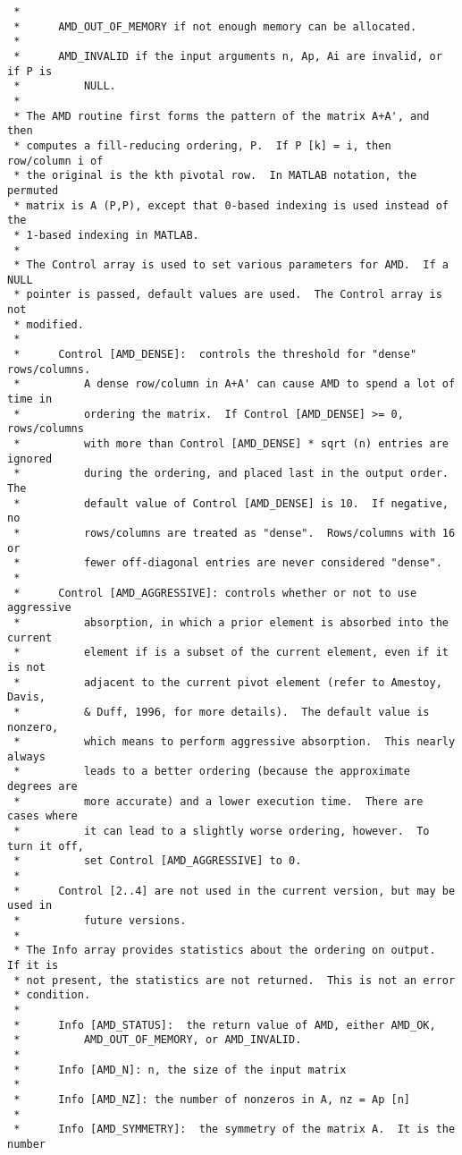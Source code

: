 \documentclass[11pt]{article}
\begin{document}
{\begin{verbatim}
 *
 *      AMD_OUT_OF_MEMORY if not enough memory can be allocated.
 *
 *      AMD_INVALID if the input arguments n, Ap, Ai are invalid, or if P is
 *          NULL.
 *
 * The AMD routine first forms the pattern of the matrix A+A', and then
 * computes a fill-reducing ordering, P.  If P [k] = i, then row/column i of
 * the original is the kth pivotal row.  In MATLAB notation, the permuted
 * matrix is A (P,P), except that 0-based indexing is used instead of the
 * 1-based indexing in MATLAB.
 *
 * The Control array is used to set various parameters for AMD.  If a NULL
 * pointer is passed, default values are used.  The Control array is not
 * modified.
 *
 *      Control [AMD_DENSE]:  controls the threshold for "dense" rows/columns.
 *          A dense row/column in A+A' can cause AMD to spend a lot of time in
 *          ordering the matrix.  If Control [AMD_DENSE] >= 0, rows/columns
 *          with more than Control [AMD_DENSE] * sqrt (n) entries are ignored
 *          during the ordering, and placed last in the output order.  The
 *          default value of Control [AMD_DENSE] is 10.  If negative, no
 *          rows/columns are treated as "dense".  Rows/columns with 16 or
 *          fewer off-diagonal entries are never considered "dense".
 *
 *      Control [AMD_AGGRESSIVE]: controls whether or not to use aggressive
 *          absorption, in which a prior element is absorbed into the current
 *          element if is a subset of the current element, even if it is not
 *          adjacent to the current pivot element (refer to Amestoy, Davis,
 *          & Duff, 1996, for more details).  The default value is nonzero,
 *          which means to perform aggressive absorption.  This nearly always
 *          leads to a better ordering (because the approximate degrees are
 *          more accurate) and a lower execution time.  There are cases where
 *          it can lead to a slightly worse ordering, however.  To turn it off,
 *          set Control [AMD_AGGRESSIVE] to 0.
 *
 *      Control [2..4] are not used in the current version, but may be used in
 *          future versions.
 *
 * The Info array provides statistics about the ordering on output.  If it is
 * not present, the statistics are not returned.  This is not an error
 * condition.
 * 
 *      Info [AMD_STATUS]:  the return value of AMD, either AMD_OK,
 *          AMD_OUT_OF_MEMORY, or AMD_INVALID.
 *
 *      Info [AMD_N]: n, the size of the input matrix
 *
 *      Info [AMD_NZ]: the number of nonzeros in A, nz = Ap [n]
 *
 *      Info [AMD_SYMMETRY]:  the symmetry of the matrix A.  It is the number

\end{verbatim}}
\end{document}

